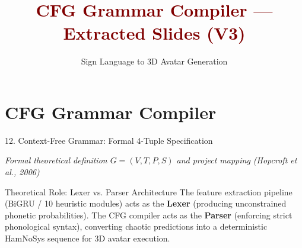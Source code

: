 \documentclass[aspectratio=169,xcolor={table,dvipsnames}]{beamer}
\title{\textcolor{maroon}{\textbf{CFG Grammar Compiler --- Extracted Slides (V3)}}}
\subtitle{Sign Language to 3D Avatar Generation}
\date{}
\begin{document}
\begin{frame}[plain]
\titlepage
\end{frame}

\section{CFG Grammar Compiler}
\begin{frame}[t]{12. Context-Free Grammar: Formal 4-Tuple Specification}
\vspace{-0.1cm}
\begin{center}
    \scriptsize\textit{\textcolor{amritaMaroon}{Formal theoretical definition $G = (V, T, P, S)$ and project mapping (Hopcroft et al., 2006)}}
\end{center}

\vspace{-1.5mm}
\begin{block}{Theoretical Role: Lexer vs. Parser Architecture}
    \fontsize{6.8pt}{8.6pt}\selectfont
    The feature extraction pipeline (BiGRU / 10 heuristic modules) acts as the \textbf{Lexer} (producing unconstrained phonetic probabilities). The CFG compiler acts as the \textbf{Parser} (enforcing strict phonological syntax), converting chaotic predictions into a deterministic HamNoSys sequence for 3D avatar execution.
\end{block}


\end{frame}
\end{document}
